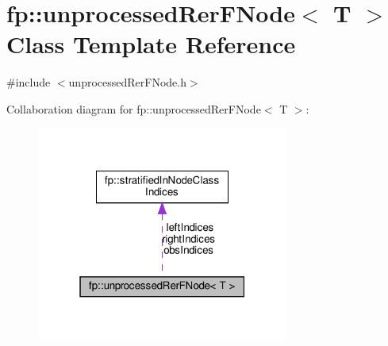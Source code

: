 \hypertarget{classfp_1_1unprocessedRerFNode}{}\section{fp\+:\+:unprocessed\+Rer\+F\+Node$<$ T $>$ Class Template Reference}
\label{classfp_1_1unprocessedRerFNode}


{\ttfamily \#include $<$unprocessed\+Rer\+F\+Node.\+h$>$}



Collaboration diagram for fp\+:\+:unprocessed\+Rer\+F\+Node$<$ T $>$\+:
\nopagebreak
\begin{figure}[H]
\begin{center}
\leavevmode
\includegraphics[width=235pt]{classfp_1_1unprocessedRerFNode__coll__graph}
\end{center}
\end{figure}
